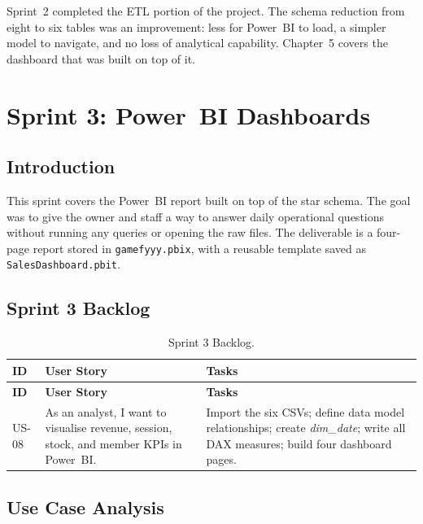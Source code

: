 \documentclass[12pt, a4paper]{report}
\begin{document}
Sprint~2 completed the ETL portion of the project. The schema reduction from eight
to six tables was an improvement: less for Power~BI to load, a simpler model to
navigate, and no loss of analytical capability. Chapter~5 covers the dashboard that
was built on top of it.

\chapter{Sprint 3: Power~BI Dashboards}

\section{Introduction}

This sprint covers the Power~BI report built on top of the star schema. The goal
was to give the owner and staff a way to answer daily operational questions without
running any queries or opening the raw files. The deliverable is a four-page report
stored in \texttt{gamefyyy.pbix}, with a reusable template saved as
\texttt{SalesDashboard.pbit}.

\section{Sprint 3 Backlog}

\begin{longtable}{>{\bfseries}p{1.3cm} p{4.2cm} p{7cm}}
  \caption{Sprint 3 Backlog.\label{tab:sprint3_backlog}} \\
  \toprule
  \textbf{ID} & \textbf{User Story} & \textbf{Tasks} \\
  \midrule
  \endfirsthead
  \toprule
  \textbf{ID} & \textbf{User Story} & \textbf{Tasks} \\
  \midrule
  \endhead
  \bottomrule
  \endfoot

  US-08 & As an analyst, I want to visualise revenue, session, stock, and
          member KPIs in Power~BI.
        & Import the six CSVs; define data model relationships; create
          \textit{dim\_date}; write all DAX measures; build four dashboard pages. \\
\end{longtable}

\section{Use Case Analysis}
\end{document}
